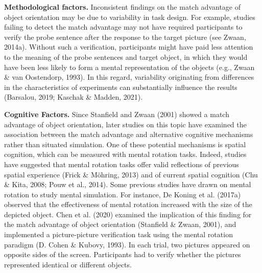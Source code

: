 \documentclass[
  man,mask,floatsintext]{apa7}
\begin{document}
\textbf{Methodological factors.} Inconsistent findings on the match advantage
of object orientation may be due to variability in task design. For
example, studies failing to detect the match advantage may not have
required participants to verify the probe sentence after the response to
the target picture (see Zwaan, 2014a). Without such a
verification, participants might have paid less attention to the meaning
of the probe sentences and target object, in which they would have been
less likely to form a mental representation of the objects (e.g., Zwaan \& van Oostendorp, 1993). In this regard, variability
originating from differences in the characteristics of experiments can
substantially influence the results
(Barsalou, 2019; Kaschak \& Madden, 2021).

\textbf{Cognitive Factors.} Since Stanfield and Zwaan (2001) showed a match
advantage of object orientation, later studies on this topic have
examined the association between the match advantage and alternative
cognitive mechanisms rather than situated simulation. One of these
potential mechanisms is spatial cognition, which can be measured with
mental rotation tasks. Indeed, studies have suggested that mental
rotation tasks offer valid reflections of previous spatial experience
(Frick \& Möhring, 2013) and of current spatial cognition
(Chu \& Kita, 2008; Pouw et al., 2014). Some
previous studies have drawn on mental rotation to study mental
simulation. For instance, De Koning et al. (2017a) observed that the
effectiveness of mental rotation increased with the size of the depicted
object. Chen et al. (2020) examined the implication of this finding
for the match advantage of object orientation (Stanfield \& Zwaan, 2001),
and implemented a picture-picture verification task using the mental
rotation paradigm (D. Cohen \& Kubovy, 1993). In each trial, two
pictures appeared on opposite sides of the screen. Participants had to
verify whether the pictures represented identical or different objects.
\end{document}

